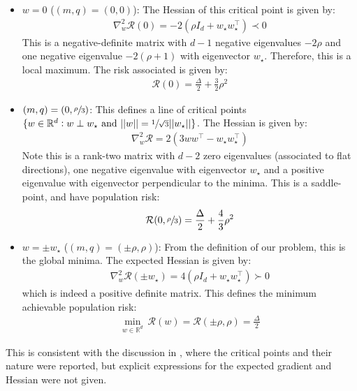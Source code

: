 \begin{itemize}
    \item $w = 0$ ($(m,q) = (0,0)$): The Hessian of this critical point is given by:
    \begin{align}
        \nabla_{w}^{2}\mathcal{R}(0) = -2(\rho I_{d}+w_{\star}w_{\star}^{\top}) \prec 0
    \end{align}
    This is a negative-definite matrix with $d-1$ negative eigenvalues $-2\rho$ and one negative eigenvalue $-2(\rho+1)$ with eigenvector $w_{\star}$. Therefore, this is a local maximum. The risk associated is given by: 
    \begin{align}
        \mathcal{R}(0) = \frac{\Delta}{2}+\frac{3}{2}\rho^2
    \end{align}
    \item $(m,q) = (0,\sfrac{\rho}{3})$: This defines a line of critical points $\{w \in\mathbb{R}^{d}: w \perp w_{\star} \text{ and }||w|| = \sfrac{1}{\sqrt{3}}||w_{\star}||\}$. The Hessian is given by:
    \begin{align}
        \nabla_{w}^{2}\mathcal{R} = 2(3ww^{\top}-w_{\star}w_{\star}^{\top}) 
    \end{align}
    Note this is a rank-two matrix with $d-2$ zero eigenvalues (associated to flat directions), one negative eigenvalue with eigenvector $w_{\star}$ and a positive eigenvalue with eigenvector perpendicular to the minima. This is a saddle-point, and have population risk:
    \begin{align}
        \mathcal{R}(0,\sfrac{\rho}{3}) = \frac{\Delta}{2}+\frac{4}{3}\rho^2
    \end{align}
    \item $w=\pm w_{\star}$ ($(m,q) = (\pm\rho,\rho)$): From the definition of our problem, this is the global minima. The expected Hessian is given by:  
    \begin{align}
        \nabla_{w}^{2}\mathcal{R}(\pm w_{\star}) = 4(\rho I_{d}+w_{\star}w_{\star}^{\top}) \succ 0
    \end{align}
    which is indeed a positive definite matrix. This defines the minimum achievable population risk:
    \begin{align}
        \underset{w\in\mathbb{R}^{d}}{\min}~\mathcal{R}(w) = \mathcal{R}(\pm\rho,\rho) = \frac{\Delta}{2}
    \end{align}
\end{itemize}
This is consistent with the discussion in \cite{chen2019gradient}, where the critical points and their nature were reported, but explicit expressions for the expected gradient and Hessian were not given. 
